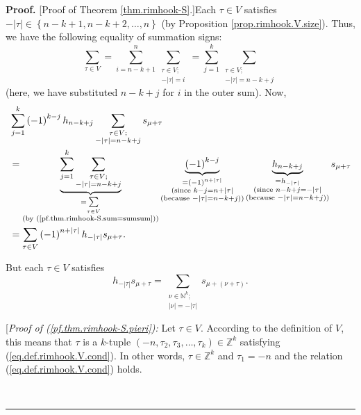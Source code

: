 \documentclass[numbers=enddot,12pt,final,onecolumn,notitlepage]{scrartcl}%
\theoremstyle{definition}
\newenvironment{proof}[1][Proof]{\noindent\textbf{#1.} }{\ \rule{0.5em}{0.5em}}
\let\sumnonlimits\sum
\renewcommand{\sum}{\sumnonlimits\limits}
\begin{document}
\begin{proof}
[Proof of Theorem \ref{thm.rimhook-S}.]Each $\tau\in V$ satisfies $-\left\vert
\tau\right\vert \in\left\{  n-k+1,n-k+2,\ldots,n\right\}  $ (by Proposition
\ref{prop.rimhook.V.size}). Thus, we have the following equality of summation
signs:%
\begin{equation}
\sum_{\tau\in V}=\sum_{i=n-k+1}^{n}\sum_{\substack{\tau\in V;\\-\left\vert
\tau\right\vert =i}}=\sum_{j=1}^{k}\sum_{\substack{\tau\in V;\\-\left\vert
\tau\right\vert =n-k+j}} \label{pf.thm.rimhook-S.sum=sumsum}%
\end{equation}
(here, we have substituted $n-k+j$ for $i$ in the outer sum). Now,%
\begin{align}
&  \sum_{j=1}^{k}\left(  -1\right)  ^{k-j}h_{n-k+j}\sum_{\substack{\tau\in
V;\\-\left\vert \tau\right\vert =n-k+j}}s_{\mu+\tau}\nonumber\\
&  =\underbrace{\sum_{j=1}^{k}\sum_{\substack{\tau\in V;\\-\left\vert
\tau\right\vert =n-k+j}}}_{\substack{=\sum_{\tau\in V}\\\text{(by
(\ref{pf.thm.rimhook-S.sum=sumsum}))}}}\underbrace{\left(  -1\right)  ^{k-j}%
}_{\substack{=\left(  -1\right)  ^{n+\left\vert \tau\right\vert }%
\\\text{(since }k-j=n+\left\vert \tau\right\vert \\\text{(because }-\left\vert
\tau\right\vert =n-k+j\text{))}}}\underbrace{h_{n-k+j}}%
_{\substack{=h_{-\left\vert \tau\right\vert }\\\text{(since }n-k+j=-\left\vert
\tau\right\vert \\\text{(because }-\left\vert \tau\right\vert =n-k+j\text{))}%
}}s_{\mu+\tau}\nonumber\\
&  =\sum_{\tau\in V}\left(  -1\right)  ^{n+\left\vert \tau\right\vert
}h_{-\left\vert \tau\right\vert }s_{\mu+\tau}. \label{pf.thm.rimhook-S.2}%
\end{align}


But each $\tau\in V$ satisfies%
\begin{equation}
h_{-\left\vert \tau\right\vert }s_{\mu+\tau}=\sum_{\substack{\nu\in
\mathbb{N}^{k};\\\left\vert \nu\right\vert =-\left\vert \tau\right\vert
}}s_{\mu+\left(  \nu+\tau\right)  }. \label{pf.thm.rimhook-S.pieri}%
\end{equation}


[\textit{Proof of (\ref{pf.thm.rimhook-S.pieri}):} Let $\tau\in V$. According
to the definition of $V$, this means that $\tau$ is a $k$-tuple $\left(
-n,\tau_{2},\tau_{3},\ldots,\tau_{k}\right)  \in\mathbb{Z}^{k}$ satisfying
(\ref{eq.def.rimhook.V.cond}). In other words, $\tau\in\mathbb{Z}^{k}$ and
$\tau_{1}=-n$ and the relation (\ref{eq.def.rimhook.V.cond}) holds.


\end{proof}
\end{document}
